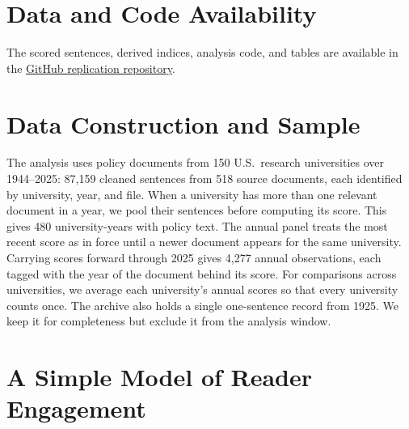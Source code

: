 \documentclass[11pt]{article}
\begin{document}
\section*{Data and Code Availability}

The scored sentences, derived indices, analysis code, and tables are available in the \href{https://github.com/krish533/Tech-transfer-1/tree/main/P1_replication_package}{GitHub replication repository}.

\singlespacing



\newpage
\appendix
\onehalfspacing
\renewcommand{\thetable}{\thesection\arabic{table}}
\renewcommand{\thefigure}{\thesection\arabic{figure}}

\section{Data Construction and Sample}\label{app:data}
\setcounter{table}{0}

The analysis uses policy documents from 150 U.S.\ research universities over 1944--2025: 87,159 cleaned sentences from 518 source documents, each identified by university, year, and file. When a university has more than one relevant document in a year, we pool their sentences before computing its score. This gives 480 university-years with policy text. The annual panel treats the most recent score as in force until a newer document appears for the same university. Carrying scores forward through 2025 gives 4,277 annual observations, each tagged with the year of the document behind its score. For comparisons across universities, we average each university's annual scores so that every university counts once. The archive also holds a single one-sentence record from 1925. We keep it for completeness but exclude it from the analysis window.

\section{A Simple Model of Reader Engagement}\label{app:comms-model}
\end{document}
